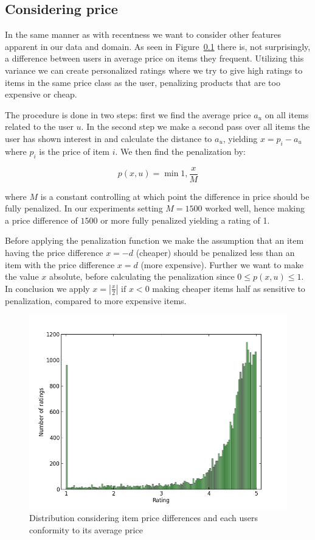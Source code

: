 \subsection{Considering price}

In the same manner as with recentness we want to consider other features
apparent in our data and domain. As seen in Figure~\ref{} there is, not
surprisingly, a difference between users in average price on items they
frequent. Utilizing this variance we can create personalized ratings where we
try to give high ratings to items in the same price class as the user,
penalizing products that are too expensive or cheap.

The procedure is done in two steps: first we find the average price $a_u$ on
all items related to the user $u$. In the second step we make a second pass
over all items the user has shown interest in and calculate the distance to
$a_u$, yielding $x = p_i - a_u$ where $p_i$ is the price of item $i$. We then
find the penalization by:

\begin{equation}
  p(x,u) = \min{1, \frac{x}{M}}
\end{equation}

where $M$ is a constant controlling at which point the difference in price
should be fully penalized. In our experiments setting $M = 1500$ worked well,
hence making a price difference of $1500$ or more fully penalized yielding a
rating of 1.

Before applying the penalization function we make the assumption that an item
having the price difference $x = -d$ (cheaper) should be penalized less than an
item with the price difference $x = d$ (more expensive). Further we want to
make the value $x$ absolute, before calculating the penalization since $0 \leq
p(x,u) \leq 1$. In conclusion we apply $x = |\frac{x}{2}|$ $\text{if}$ $ x < 0$
making cheaper items half as sensitive to penalization, compared to more
expensive items.

\begin{figure}[H]
  \centering
  \includegraphics[scale=0.5]{image/dist-price}
  \caption{Distribution considering item price differences and each users conformity to
  its average price}
  \label{fig:dist-price}
\end{figure}

